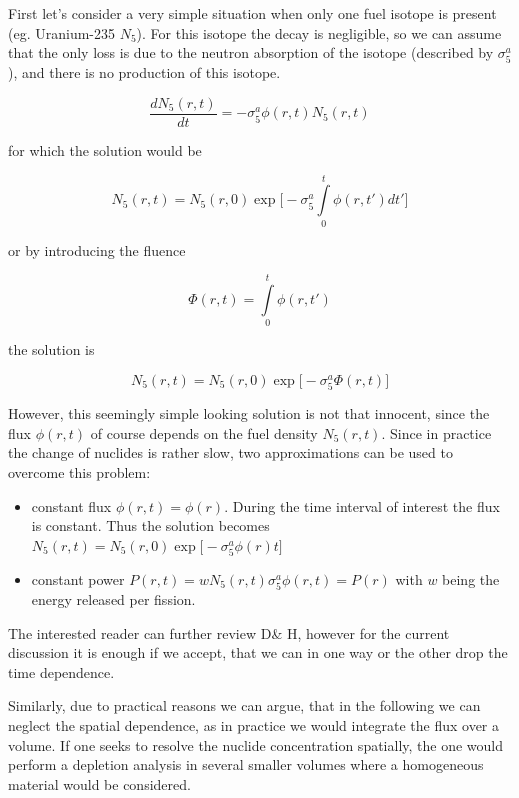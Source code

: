 First let's consider a very simple situation when only one fuel isotope is present (eg. Uranium-235 $N_5$). For this isotope the decay is negligible, so we can assume that the only loss is due to the neutron absorption of  the isotope (described by $\sigma_5^a$), and there is no production of this isotope.

\begin{equation}
\frac{dN_5(r,t)}{dt}=-\sigma_5^a\phi(r,t)N_5(r,t)
\end{equation}

for which the solution would be 

\begin{equation}
N_5(r,t)=N_5(r,0)\exp\Big[-\sigma_5^a\int\limits_0^t\phi(r,t')dt'\Big]
\end{equation}

or by introducing the fluence

\begin{equation}\label{eq:fluence}
\Phi(r,t)=\int\limits_0^t\phi(r,t')
\end{equation}

the solution is

\begin{equation}
N_5(r,t)=N_5(r,0)\exp\Big[-\sigma_5^a\Phi(r,t)\Big]
\end{equation}

However, this seemingly simple looking solution is not that innocent, since the flux $\phi(r,t)$ of course depends on the fuel density $N_5(r,t)$. Since in practice the change of nuclides is rather slow, two approximations can be used to overcome this problem:

\begin{itemize}
\item constant flux $\phi(r,t)=\phi(r)$. During the time interval of interest the flux is constant. Thus the solution becomes \newline $N_5(r,t)=N_5(r,0)\exp\Big[-\sigma_5^a\phi(r)t\Big]$
\item constant power $P(r,t)=wN_5(r,t)\sigma_5^a\phi(r,t)=P(r)$ with $w$ being the energy released per fission. 
\end{itemize}

The interested reader can further review D\& H, however for the current discussion it is enough if we accept, that we can in one way or the other drop the time dependence. 

Similarly, due to practical reasons we can argue, that in the following we can neglect the spatial dependence, as in practice we would integrate the flux over a volume. If one seeks to resolve the nuclide concentration spatially, the one would perform a depletion analysis in several smaller volumes where a homogeneous material would be considered. 



